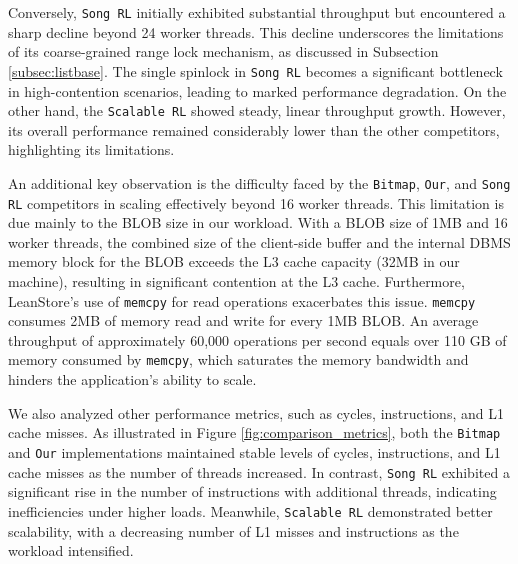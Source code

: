 Conversely, \texttt{Song RL} initially exhibited substantial throughput but encountered a sharp decline beyond 24 worker threads. 
This decline underscores the limitations of its coarse-grained range lock mechanism, as discussed in Subsection \ref{subsec:listbase}. 
The single spinlock in \texttt{Song RL} becomes a significant bottleneck in high-contention scenarios, leading to marked performance degradation. 
On the other hand, the \texttt{Scalable RL} showed steady, linear throughput growth. 
However, its overall performance remained considerably lower than the other competitors, highlighting its limitations.

An additional key observation is the difficulty faced by the \texttt{Bitmap}, \texttt{Our}, and \texttt{Song RL} competitors in scaling effectively beyond 16 worker threads. 
This limitation is due mainly to the BLOB size in our workload. With a BLOB size of 1MB and 16 worker threads, the combined size of the client-side buffer and the internal DBMS memory block for the BLOB exceeds the L3 cache capacity (32MB in our machine), resulting in significant contention at the L3 cache. 
Furthermore, LeanStore's use of \texttt{memcpy} for read operations exacerbates this issue. \texttt{memcpy} consumes 2MB of memory read and write for every 1MB BLOB. 
An average throughput of approximately 60,000 operations per second equals over 110 GB of memory consumed by \texttt{memcpy}, which saturates the memory bandwidth and hinders the application's ability to scale.

We also analyzed other performance metrics, such as cycles, instructions, and L1 cache misses. 
As illustrated in Figure \ref{fig:comparison_metrics}, both the \texttt{Bitmap} and \texttt{Our} implementations maintained stable levels of cycles, instructions, and L1 cache misses as the number of threads increased. 
In contrast, \texttt{Song RL} exhibited a significant rise in the number of instructions with additional threads, indicating inefficiencies under higher loads. 
Meanwhile, \texttt{Scalable RL} demonstrated better scalability, with a decreasing number of L1 misses and instructions as the workload intensified.


